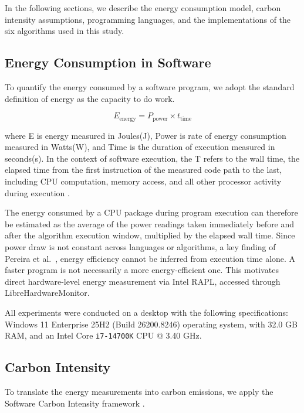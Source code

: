 In the following sections, we describe the energy consumption model, carbon intensity assumptions, programming languages, and the implementations of the six algorithms used in this study.

\subsection{Energy Consumption in Software}
To quantify the energy consumed by a software program, we adopt the standard definition of energy as the capacity to do work. 

\begin{equation}
    \label{eq:energy_formula}
    E_{\text{energy}} = P_{\text{power}} \times t_{\text{time}}
\end{equation}

where E is energy measured in Joules(J), Power is rate of energy consumption measured in Watts(W), and Time is the duration of execution measured in seconds(s)\cite{8323579}. In the context of software execution, the T refers to the wall time, the elapsed time from the first instruction of the measured code path to the last, including CPU computation, memory access, and all other processor activity during execution \cite{carter2024}. 

The energy consumed by a CPU package during program execution can therefore be estimated as the average of the power readings taken immediately before and after the algorithm execution window, multiplied by the elapsed wall time. Since power draw is not constant across languages or algorithms, a key finding of Pereira et al.~\cite{10.1145/3136014.3136031}, energy efficiency cannot be inferred from execution time alone. A faster program is not necessarily a more energy-efficient one. This motivates direct hardware-level energy measurement via Intel RAPL, accessed through LibreHardwareMonitor.

All experiments were conducted on a desktop with the following specifications: Windows 11 Enterprise 25H2 (Build 26200.8246) operating system, with 32.0 GB RAM, and an Intel Core \verb|i7-14700K| CPU @ 3.40 GHz.




\subsection{Carbon Intensity}
To translate the energy measurements into carbon emissions, we apply the Software Carbon Intensity framework \cite{grnsoftware2023}.

